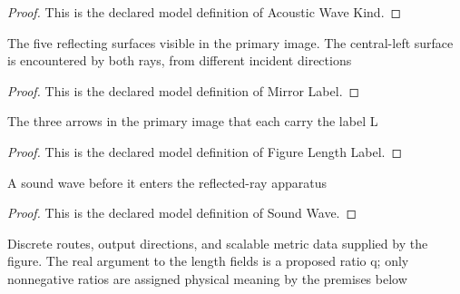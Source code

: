 \begin{proof}
  This is the declared model definition of Acoustic Wave Kind.
\end{proof}
\begin{definition}
  \label{def:physics:phyx-mini-0311:phyxminiproblems-problemphyxmini0311-mirrorlabel}
  The five reflecting surfaces visible in the primary image. The central-left surface is encountered by both rays, from different incident directions
\end{definition}
\begin{proof}
  This is the declared model definition of Mirror Label.
\end{proof}
\begin{definition}
  \label{def:physics:phyx-mini-0311:phyxminiproblems-problemphyxmini0311-figurelengthlabel}
  The three arrows in the primary image that each carry the label L
\end{definition}
\begin{proof}
  This is the declared model definition of Figure Length Label.
\end{proof}
\begin{definition}
  \label{def:physics:phyx-mini-0311:phyxminiproblems-problemphyxmini0311-soundwave}
  A sound wave before it enters the reflected-ray apparatus
\end{definition}
\begin{proof}
  This is the declared model definition of Sound Wave.
\end{proof}
\begin{definition}
  \label{def:physics:phyx-mini-0311:phyxminiproblems-problemphyxmini0311-reflectionfigure}
  Discrete routes, output directions, and scalable metric data supplied by the figure. The real argument to the length fields is a proposed ratio q; only nonnegative ratios are assigned physical meaning by the premises below
\end{definition}
